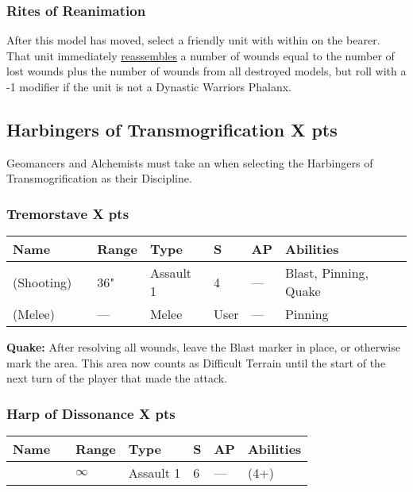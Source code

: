 \subsubsection{Rites of Reanimation} \label{Rites of Reanimation}

After this model has moved, select a friendly unit with  within  on the bearer. That unit immediately \textcolor{violet}{\hyperref[Reanimation Protocols]{reassembles}} a number of wounds equal to the number of lost wounds plus the number of wounds from all destroyed models, but roll with a -1 modifier if the unit is not a Dynastic Warriors Phalanx.



\subsection[Harbingers of Transmogrification ]{Harbingers of Transmogrification  \hrulefill X pts}

Geomancers and Alchemists must take an  when selecting the Harbingers of Transmogrification as their Discipline.

\subsubsection[Tremorstave]{Tremorstave \hrulefill X pts}
\label{Tremorstave}
\noindent
\begin{tabular}{||m{130pt} m{10pt} m{31pt} m{55pt} m{12pt} m{12pt} m{210pt}||}
	\hline
	Name & & Range & Type & S & AP & Abilities \\
	\hline
	\quickref{Tremorstave} (Shooting) & & 36" & Assault 1 & 4 & — & Blast, Pinning, Quake \\
	\quickref{Tremorstave} (Melee) & & — & Melee & User & — & Pinning \\
	\hline
\end{tabular}
\textbf{Quake:} After resolving all wounds, leave the Blast marker in place, or otherwise mark the area. This area now counts as Difficult Terrain until the start of the next turn of the player that made the attack.

\subsubsection[Harp of Dissonance ]{Harp of Dissonance  \hrulefill X pts}

\label{Harp of Dissonance}
\noindent
\begin{tabular}{||m{130pt} m{10pt} m{31pt} m{55pt} m{12pt} m{12pt} m{210pt}||}
	\hline
	Name & & Range & Type & S & AP & Abilities \\
	\hline
	\quickref{Harp of Dissonance} & & $\infty$ & Assault 1 & 6 & — & \quickref{Entropic Strike} (4+) \\
	\hline
\end{tabular}

